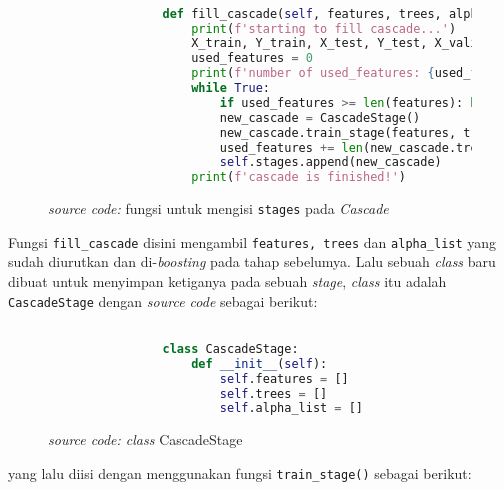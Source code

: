 		\begin{figure}[H]
			\begin{lstlisting}[language=Python, basicstyle=\tiny]

				def fill_cascade(self, features, trees, alpha_list, splits):
					print(f'starting to fill cascade...')
					X_train, Y_train, X_test, Y_test, X_valid, Y_valid = splits
					used_features = 0
					print(f'number of used_features: {used_features}')
					while True:
						if used_features >= len(features): break
						new_cascade = CascadeStage()
						new_cascade.train_stage(features, trees, alpha_list, X_valid, Y_valid, used_features)
						used_features += len(new_cascade.trees) #check the total number of features used
						self.stages.append(new_cascade)
					print(f'cascade is finished!')

			\end{lstlisting}
			\caption{\emph{source code:} fungsi untuk mengisi \texttt{stages} pada 
			\emph{Cascade}}
			\label{code: fill cascade function}
		\end{figure}

		Fungsi \texttt{fill\_cascade} disini mengambil \texttt{features, trees} dan \texttt{alpha\_list} 
		yang sudah diurutkan dan di-\emph{boosting} pada tahap sebelumya. Lalu sebuah \textit{class} 
		baru dibuat untuk menyimpan ketiganya pada sebuah \emph{stage}, \textit{class} itu adalah 
		\texttt{CascadeStage} dengan \textit{source code} sebagai berikut:

		\begin{figure}[H]
			\begin{lstlisting}[language=Python, basicstyle=\tiny]

				class CascadeStage:
					def __init__(self):
						self.features = []
						self.trees = []
						self.alpha_list = []

			\end{lstlisting}
			\caption{\emph{source code: class} CascadeStage}
			\label{code: Cascade Class}
		\end{figure}

		yang lalu diisi dengan menggunakan fungsi \texttt{train\_stage()} sebagai berikut:

